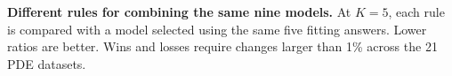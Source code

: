 \begin{table}[h!]
\centering\small
\caption{\textbf{Different rules for combining the same nine models.} At $K=5$,
each rule is compared with a model selected using the same five fitting
answers. Lower ratios are better. Wins and losses require changes larger than
1\% across the 21 PDE datasets.}
\label{tab:main}
\end{table}
